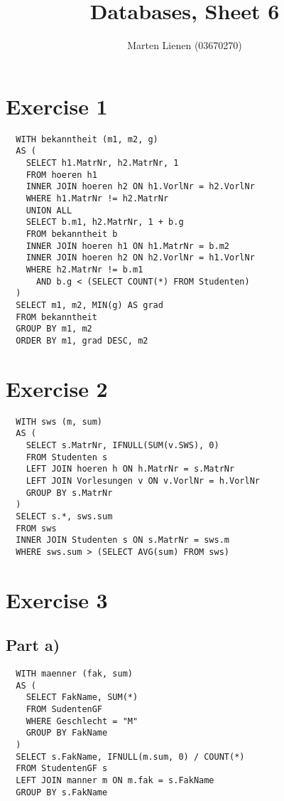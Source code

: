 \documentclass[10pt,a4paper]{article}
\title{Databases, Sheet 6}
\author{Marten Lienen (03670270)}
\begin{document}
\maketitle

\section*{Exercise 1}

\begin{verbatim}
  WITH bekanntheit (m1, m2, g)
  AS (
    SELECT h1.MatrNr, h2.MatrNr, 1
    FROM hoeren h1
    INNER JOIN hoeren h2 ON h1.VorlNr = h2.VorlNr
    WHERE h1.MatrNr != h2.MatrNr
    UNION ALL
    SELECT b.m1, h2.MatrNr, 1 + b.g
    FROM bekanntheit b
    INNER JOIN hoeren h1 ON h1.MatrNr = b.m2
    INNER JOIN hoeren h2 ON h2.VorlNr = h1.VorlNr
    WHERE h2.MatrNr != b.m1
      AND b.g < (SELECT COUNT(*) FROM Studenten)
  )
  SELECT m1, m2, MIN(g) AS grad
  FROM bekanntheit
  GROUP BY m1, m2
  ORDER BY m1, grad DESC, m2
\end{verbatim}

\section*{Exercise 2}

\begin{verbatim}
  WITH sws (m, sum)
  AS (
    SELECT s.MatrNr, IFNULL(SUM(v.SWS), 0)
    FROM Studenten s
    LEFT JOIN hoeren h ON h.MatrNr = s.MatrNr
    LEFT JOIN Vorlesungen v ON v.VorlNr = h.VorlNr
    GROUP BY s.MatrNr
  )
  SELECT s.*, sws.sum
  FROM sws
  INNER JOIN Studenten s ON s.MatrNr = sws.m
  WHERE sws.sum > (SELECT AVG(sum) FROM sws)
\end{verbatim}

\section*{Exercise 3}

\subsection*{Part a)}

\begin{verbatim}
  WITH maenner (fak, sum)
  AS (
    SELECT FakName, SUM(*)
    FROM SudentenGF
    WHERE Geschlecht = "M"
    GROUP BY FakName
  )
  SELECT s.FakName, IFNULL(m.sum, 0) / COUNT(*)
  FROM StudentenGF s
  LEFT JOIN manner m ON m.fak = s.FakName
  GROUP BY s.FakName
\end{verbatim}
\end{document}
